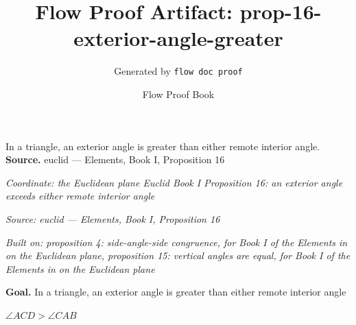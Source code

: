 \documentclass[11pt]{article}
\title{Flow Proof Artifact: prop-16-exterior-angle-greater}
\author{Generated by \texttt{flow doc proof}}
\date{Flow Proof Book}
\theoremstyle{definition}
\begin{document}
\maketitle
In a triangle, an exterior angle is greater than either remote interior angle.\\[0.5em]
\textbf{Source.} euclid — Elements, Book I, Proposition 16\\[0.5em]
\bigskip
{}\par
\smallskip\noindent\textit{Coordinate: the Euclidean plane \cdot Euclid Book I \cdot Proposition 16: an exterior angle exceeds either remote interior angle}\par
\smallskip\noindent\textit{Source: euclid — Elements, Book I, Proposition 16}\par
\smallskip\noindent\textit{Built on: proposition 4: side-angle-side congruence, for Book I of the Elements in on the Euclidean plane, proposition 15: vertical angles are equal, for Book I of the Elements in on the Euclidean plane}\par
\medskip
\noindent\textbf{Goal.} In a triangle, an exterior angle is greater than either remote interior angle\par
\noindent$\displaystyle \angle ACD > \angle CAB$\par
\medskip
\noindent
\end{document}
